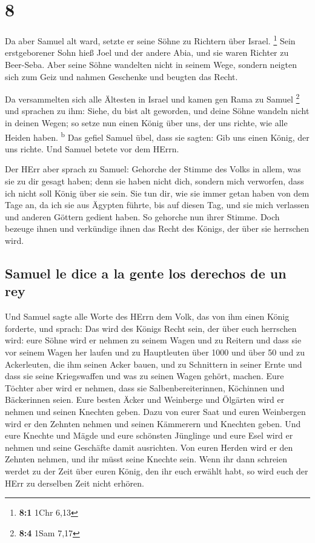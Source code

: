 \hypertarget{section-7}{%
\section{8}\label{section-7}}

 Da aber Samuel alt ward, setzte er seine Söhne zu
Richtern über Israel. \footnote{\textbf{8:1} 1Chr 6,13} 
Sein erstgeborener Sohn hieß Joel und der andere Abia, und sie waren
Richter zu Beer-Seba.  Aber seine Söhne wandelten nicht in
seinem Wege, sondern neigten sich zum Geiz und nahmen Geschenke und
beugten das Recht.

 Da versammelten sich alle Ältesten in Israel und kamen
gen Rama zu Samuel \footnote{\textbf{8:4} 1Sam 7,17}  und
sprachen zu ihm: Siehe, du bist alt geworden, und deine Söhne wandeln
nicht in deinen Wegen; so setze nun einen König über uns, der uns
richte, wie alle Heiden haben. \textsuperscript{b}  Das
gefiel Samuel übel, dass sie sagten: Gib uns einen König, der uns
richte. Und Samuel betete vor dem HErrn.

 Der HErr aber sprach zu Samuel: Gehorche der Stimme des
Volks in allem, was sie zu dir gesagt haben; denn sie haben nicht dich,
sondern mich verworfen, dass ich nicht soll König über sie sein.
 Sie tun dir, wie sie immer getan haben von dem Tage an,
da ich sie aus Ägypten führte, bis auf diesen Tag, und sie mich
verlassen und anderen Göttern gedient haben.  So gehorche
nun ihrer Stimme. Doch bezeuge ihnen und verkündige ihnen das Recht des
Königs, der über sie herrschen wird.

\hypertarget{samuel-le-dice-a-la-gente-los-derechos-de-un-rey}{%
\subsection{Samuel le dice a la gente los derechos de un
rey}\label{samuel-le-dice-a-la-gente-los-derechos-de-un-rey}}

 Und Samuel sagte alle Worte des HErrn dem Volk, das von
ihm einen König forderte,  und sprach: Das wird des
Königs Recht sein, der über euch herrschen wird: eure Söhne wird er
nehmen zu seinem Wagen und zu Reitern und dass sie vor seinem Wagen her
laufen  und zu Hauptleuten über 1000 und über 50 und zu
Ackerleuten, die ihm seinen Acker bauen, und zu Schnittern in seiner
Ernte und dass sie seine Kriegswaffen und was zu seinen Wagen gehört,
machen.  Eure Töchter aber wird er nehmen, dass sie
Salbenbereiterinnen, Köchinnen und Bäckerinnen seien. 
Eure besten Äcker und Weinberge und Ölgärten wird er nehmen und seinen
Knechten geben.  Dazu von eurer Saat und euren Weinbergen
wird er den Zehnten nehmen und seinen Kämmerern und Knechten geben.
 Und eure Knechte und Mägde und eure schönsten Jünglinge
und eure Esel wird er nehmen und seine Geschäfte damit ausrichten.
 Von euren Herden wird er den Zehnten nehmen, und ihr
müsst seine Knechte sein.  Wenn ihr dann schreien werdet
zu der Zeit über euren König, den ihr euch erwählt habt, so wird euch
der HErr zu derselben Zeit nicht erhören.

